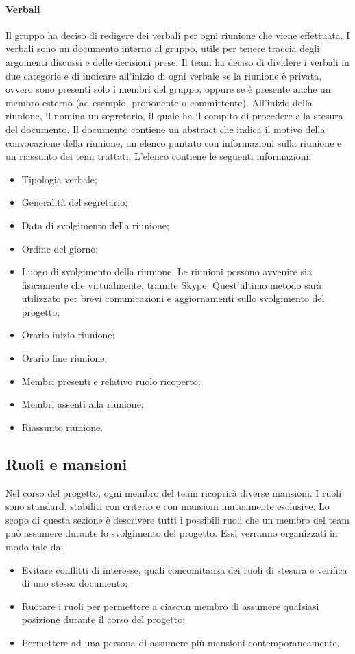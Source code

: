 			\paragraph{Verbali}
			Il gruppo ha deciso di redigere dei verbali per ogni riunione che viene effettuata. I verbali sono un documento interno al gruppo, utile per tenere traccia degli argomenti discussi e delle decisioni prese. Il team ha deciso di dividere i verbali in due categorie e di indicare all'inizio di ogni verbale se la riunione è privata, ovvero sono presenti solo i membri del gruppo, oppure se è presente anche un membro esterno (ad esempio, proponente o committente). All'inizio della riunione, il \textit{\RdP} nomina un segretario, il quale ha il compito di procedere alla stesura del documento. Il documento contiene un abstract che indica il motivo della convocazione della riunione, un elenco puntato con informazioni sulla riunione e un riassunto dei temi trattati. L'elenco contiene le seguenti informazioni:
			\begin{itemize}
				\item Tipologia verbale;
				\item Generalità del segretario;
				\item Data di svolgimento della riunione;
				\item Ordine del giorno;
				\item Luogo di svolgimento della riunione. Le riunioni possono avvenire sia fisicamente che virtualmente, tramite Skype. Quest'ultimo metodo sarà utilizzato per brevi comunicazioni e aggiornamenti sullo svolgimento del progetto;
				\item Orario inizio riunione;
				\item Orario fine riunione;
				\item Membri presenti e relativo ruolo ricoperto;
				\item Membri assenti alla riunione;
				\item Riassunto riunione.
			\end{itemize}

	\subsection{Ruoli e mansioni}
	Nel corso del progetto, ogni membro del team ricoprirà diverse mansioni. I ruoli sono standard, stabiliti con criterio e con mansioni mutuamente esclusive. Lo scopo di questa sezione è descrivere tutti i possibili ruoli che un membro del team può assumere durante lo svolgimento del progetto. Essi verranno organizzati in modo tale da:
	\begin{itemize}
		\item Evitare conflitti di interesse, quali concomitanza dei ruoli di stesura e verifica di uno stesso documento;
		\item Ruotare i ruoli per permettere a ciascun membro di assumere qualsiasi posizione durante il corso del progetto;
		\item Permettere ad una persona di assumere più mansioni contemporaneamente.
	\end{itemize}

